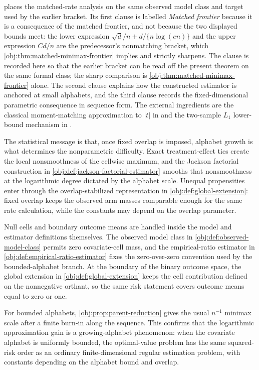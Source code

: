 \documentclass[11pt]{article}
\begin{document}
 places the matched-rate analysis on the same observed model class and target used by the earlier bracket. Its first clause is labelled \emph{Matched frontier} because it is a consequence of the matched frontier, and not because the two displayed bounds meet: the lower expression \(\sqrt d/n+d/\{n\log(en)\}\) and the upper expression \(Cd/n\) are the predecessor's nonmatching bracket, which \cref{obj:thm:matched-minimax-frontier} implies and strictly sharpens. The clause is recorded here so that the earlier bracket can be read off the present theorem on the same formal class; the sharp comparison is \cref{obj:thm:matched-minimax-frontier} alone. The second clause explains how the constructed estimator is anchored at small alphabets, and the third clause records the fixed-dimensional parametric consequence in sequence form. The external ingredients are the classical moment-matching approximation to \(|t|\) in \citet[Lemma 1 and Section 3.1]{CaiLow2011L1} and the two-sample \(L_1\) lower-bound mechanism in \citet[Theorem 3, equation (24)]{JiaoHanWeissman2018L1}.

The statistical message is that, once fixed overlap is imposed, alphabet growth is what determines the nonparametric difficulty. Exact treatment-effect ties create the local nonsmoothness of the cellwise maximum, and the Jackson factorial construction in \cref{obj:def:jackson-factorial-estimator} smooths that nonsmoothness at the logarithmic degree dictated by the alphabet scale. Unequal propensities enter through the overlap-stabilized representation in \cref{obj:def:global-extension}: fixed overlap keeps the observed arm masses comparable enough for the same rate calculation, while the constants may depend on the overlap parameter.

Null cells and boundary outcome means are handled inside the model and estimator definitions themselves. The observed model class in \cref{obj:def:observed-model-class} permits zero covariate-cell mass, and the empirical-ratio estimator in \cref{obj:def:empirical-ratio-estimator} fixes the zero-over-zero convention used by the bounded-alphabet branch. At the boundary of the binary outcome space, the global extension in \cref{obj:def:global-extension} keeps the cell contribution defined on the nonnegative orthant, so the same risk statement covers outcome means equal to zero or one.

For bounded alphabets, \cref{obj:prop:parent-reduction} gives the usual \(n^{-1}\) minimax scale after a finite burn-in along the sequence. This confirms that the logarithmic approximation gain is a growing-alphabet phenomenon: when the covariate alphabet is uniformly bounded, the optimal-value problem has the same squared-risk order as an ordinary finite-dimensional regular estimation problem, with constants depending on the alphabet bound and overlap.
\end{document}
